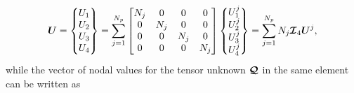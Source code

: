 \documentclass[a4paper,10pt]{article}
\newcommand{\bm}[1]{\text{\boldmath$#1$\unboldmath}}
\newcommand{\DiscFunc}[1]{\bm{#1}}
\newcommand{\SecOrdTens}[1]{\bm{\mathcal{#1}}}
\renewcommand{\u}{\DiscFunc{U}}
\newcommand{\G}{\SecOrdTens{Q}}
\newcommand{\I}{\SecOrdTens{I}}
\begin{document}
\[
 \u = \begin{Bmatrix}
               U_1\\
               U_2\\
               U_3\\
               U_4               
              \end{Bmatrix}=
\sum_{j=1}^{N_p} \begin{bmatrix}
                  N_j   &       0      &       0     &       0 \\ 
                  0     &      N_j     &       0     &       0 \\
                  0     &       0      &      N_j    &       0 \\
                  0     &       0      &       0     &       N_j 
                 \end{bmatrix}
                 \begin{Bmatrix}
                    U_1^j\\
                    U_2^j\\
                    U_3^j\\
                    U_4^j  
                 \end{Bmatrix}=
\sum_{j=1}^{N_p} N_j \I_4 \u^j,
\]
while the vector of nodal values for the tensor unknown $\G$ in the same element can be written as
\end{document}
